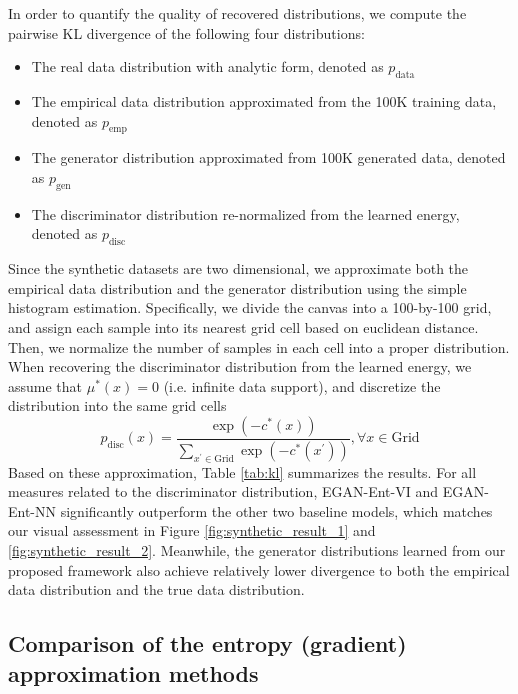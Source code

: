 \documentclass[a4paper]{article}
\newcommand{\pd}{p_\text{data}}
\newcommand{\pg}{p_\text{gen}}
\begin{document}
In order to quantify the quality of recovered distributions, we compute the pairwise KL divergence of the following four distributions:
\begin{itemize}
\item The real data distribution with analytic form, denoted as $\pd$
\item The empirical data distribution approximated from the 100K training data, denoted as $p_\text{emp}$
\item The generator distribution approximated from 100K generated data, denoted as $\pg$
\item The discriminator distribution re-normalized from the learned energy, denoted as $p_\text{disc}$
\end{itemize}
Since the synthetic datasets are two dimensional, we approximate both the empirical data distribution and the generator distribution using the simple histogram estimation.
Specifically, we divide the canvas into a 100-by-100 grid, and assign each sample into its nearest grid cell based on euclidean distance.
Then, we normalize the number of samples in each cell into a proper distribution.
When recovering the discriminator distribution from the learned energy, we assume that $\mu^*(x) = 0$ (i.e. infinite data support), and discretize the distribution into the same grid cells
\begin{equation*}
p_\text{disc}(x) = \frac{\exp(-c^*(x))}{\sum_{x^\prime \in \text{Grid}} \exp(-c^*(x^\prime))}, \forall x \in \text{Grid}
\end{equation*}
Based on these approximation, Table \ref{tab:kl} summarizes the results.
For all measures related to the discriminator distribution, EGAN-Ent-VI and EGAN-Ent-NN significantly outperform the other two baseline models, which matches our visual assessment in Figure \ref{fig:synthetic_result_1} and \ref{fig:synthetic_result_2}.
Meanwhile, the generator distributions learned from our proposed framework also achieve relatively lower divergence to both the empirical data distribution and the true data distribution.

\subsection{Comparison of the entropy (gradient) approximation methods}
\label{sec:vi_vs_knn}
\end{document}
